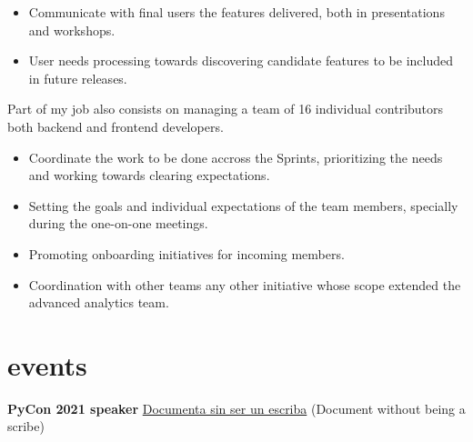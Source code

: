 \documentclass[]{friggeri-cv}
\begin{document}
\begin{entrylist}
{\begin{itemize}
  \item Communicate with final users the features delivered, both in presentations and workshops.
  \item User needs processing towards discovering candidate features to be included in future releases.
\end{itemize}
Part of my job also consists on managing a team of 16 individual contributors both backend and frontend developers.
\begin{itemize}
  \item Coordinate the work to be done accross the Sprints, prioritizing the needs and working towards clearing expectations.
  \item Setting the goals and individual expectations of the team members, specially during the one-on-one meetings.
  \item Promoting onboarding initiatives for incoming members.
  \item Coordination with other teams any other initiative whose scope extended the advanced analytics team.
\end{itemize}}
\end{entrylist}


\section{events}

\textbf{\headingfont PyCon 2021 speaker} \href{https://www.youtube.com/watch?v=U8SP_Osd8ZY}{Documenta sin ser un escriba} (Document without being a scribe)
 
\end{document}
